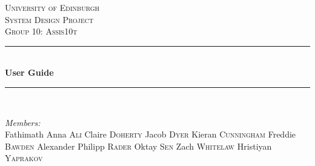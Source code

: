 \documentclass[12pt]{article}
\begin{document}
\begin{titlepage}

\newcommand{\HRule}{\rule{\linewidth}{0.5mm}} 

\center %
 


\hspace{2.5cm}\textsc{\LARGE University of Edinburgh}\\[1.5cm] %
\textsc{\Large System Design Project}\\[0.5cm] %
\textsc{\large Group 10: Assis10t}\\[0.5cm] %


\HRule \\[0.4cm]
{ \huge \bfseries User Guide}\\[0.4cm] %
\HRule \\[1.5cm]
 
\begin{minipage}{0.45\textwidth}
\begin{flushleft} \large
\emph{Members:}\\
Fathimath Anna \textsc{Ali}
\newline Claire \textsc{Doherty}
\newline Jacob \textsc{Dyer}
\newline Kieran \textsc{Cunningham}
\newline Freddie \textsc{Bawden}
\newline Alexander Philipp \textsc{Rader}
\newline Oktay \textsc{Sen}
\newline Zach \textsc{Whitelaw}
\newline Hristiyan \textsc{Yaprakov}


\end{flushleft}
\end{minipage}
\end{titlepage}
\end{document}

